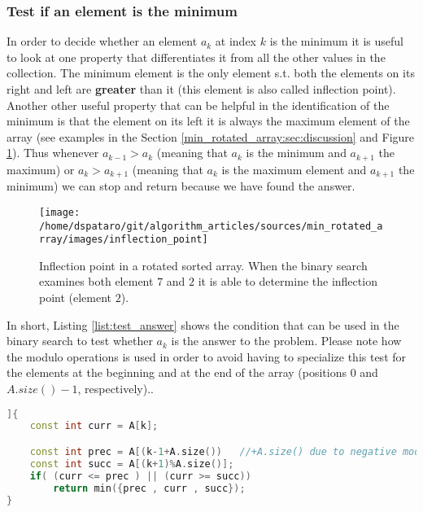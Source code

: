\subsubsection{Test if an element is the minimum}
In order to decide whether an element $a_k$ at index $k$ is the minimum it is useful to look at one property that differentiates it from all the other values in the collection.
The minimum element is the only element s.t. both the elements on its right and left are \textbf{greater} than it (this element is also called inflection point). Another other useful property that can be helpful in the identification of the minimum is that the element on its left it is always the maximum element of the array (see examples in the Section \ref{min_rotated_array:sec:discussion} and Figure \ref{fig:min_rotated_array:test_element}). Thus whenever $a_{k-1} > a_{k}$ (meaning that $a_k$ is the minimum and $a_{k+1}$ the maximum) or $a_{k} > a_{k+1}$ (meaning that $a_k$ is the maximum element and $a_{k+1}$ the minimum) we can stop and return because we have found the answer. 

\begin{figure}
	\centering
	\texttt{[image: /home/dspataro/git/algorithm\_articles/sources/min\_rotated\_array/images/inflection\_point]}
	\caption{Inflection point in a rotated sorted array. When the binary search examines both element $7$ and $2$ it is able to determine the inflection point (element $2$). }
	\label{fig:min_rotated_array:test_element}
\end{figure}

In short, Listing \ref{list:test_answer} shows the condition that can be used in the binary search to test whether $a_k$ is the answer to the problem. Please note how the modulo operations is used in order to avoid having to specialize this test for the elements at the beginning and at the end of the array (positions $0$ and $A.size()-1$, respectively).. 

\begin{lstlisting}[language=c++, caption={Test to verify whether the binary search can stop because an answer has been found.},label=list:test_answer]]{
	const int curr = A[k];

	const int prec = A[(k-1+A.size()) 	//+A.size() due to negative modulo
	const int succ = A[(k+1)%A.size()];
	if( (curr <= prec ) || (curr >= succ))
		return min({prec , curr , succ});
}
\end{lstlisting}

